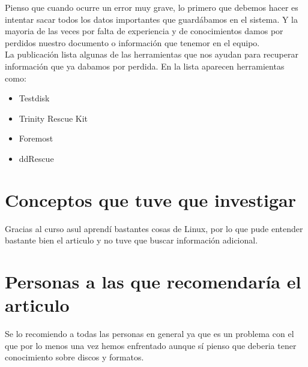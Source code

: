 \documentclass[11pt, a4paper]{report}
\begin{document}
Pienso que cuando ocurre un error muy grave, lo primero que debemos hacer es
intentar sacar todos los datos importantes que guardábamos en el sistema. Y la
mayoria de las veces por falta de experiencia y de conocimientos damos por
perdidos nuestro documento o información que tenemor en el equipo. \\

La publicación lista algunas de las herramientas que nos ayudan para recuperar
información que ya dabamos por perdida. En la lista aparecen herramientas como:

\begin{itemize}
\item Testdisk
\item Trinity Rescue Kit
\item Foremost
\item ddRescue
\end{itemize}

\section*{Conceptos que tuve que investigar}
Gracias al curso asul aprendí bastantes cosas de Linux, por lo que pude entender
bastante bien el articulo y no tuve que buscar información adicional.

\section*{Personas a las que recomendaría el articulo}
Se lo recomiendo a todas las personas en general ya que es un problema con el
que por lo menos una vez hemos enfrentado aunque sí pienso que deberia tener
conocimiento sobre discos y formatos.
\end{document}
